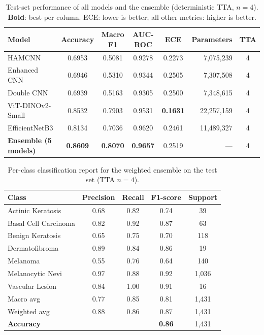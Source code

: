 \documentclass[10pt,twocolumn]{article}
\begin{document}
\begin{table}[t]
\centering
\small
\caption{Test-set performance of all models and the ensemble (deterministic TTA, $n=4$). \textbf{Bold}: best per column. ECE: lower is better; all other metrics: higher is better.}
\label{tab:results}
\begin{tabular}{lccccrc}
\toprule
\textbf{Model} & \textbf{Accuracy} & \textbf{Macro F1} & \textbf{AUC-ROC} & \textbf{ECE} & \textbf{Parameters} & \textbf{TTA} \\
\midrule
HAMCNN                        & 0.6953 & 0.5081 & 0.9278 & 0.2273          & 7,075,239  & 4 \\
Enhanced CNN                  & 0.6946 & 0.5310 & 0.9344 & 0.2505          & 7,307,508  & 4 \\
Double CNN                    & 0.6939 & 0.5163 & 0.9305 & 0.2500          & 7,348,615  & 4 \\
ViT-DINOv2-Small              & 0.8532 & 0.7903 & 0.9531 & \textbf{0.1631} & 22,257,159 & 4 \\
EfficientNetB3                & 0.8134 & 0.7036 & 0.9620 & 0.2461          & 11,489,327 & 4 \\
\midrule
\textbf{Ensemble (5 models)}  & \textbf{0.8609} & \textbf{0.8070} & \textbf{0.9657} & 0.2519 & --- & 4 \\
\bottomrule
\end{tabular}
\end{table}

\begin{table}[t]
\centering
\small
\caption{Per-class classification report for the weighted ensemble on the test set (TTA $n=4$).}
\label{tab:per_class}
\begin{tabular}{lcccc}
\toprule
\textbf{Class} & \textbf{Precision} & \textbf{Recall} & \textbf{F1-score} & \textbf{Support} \\
\midrule
Actinic Keratosis    & 0.68 & 0.82 & 0.74 &     39 \\
Basal Cell Carcinoma & 0.82 & 0.92 & 0.87 &     63 \\
Benign Keratosis     & 0.65 & 0.75 & 0.70 &    118 \\
Dermatofibroma       & 0.89 & 0.84 & 0.86 &     19 \\
Melanoma             & 0.55 & 0.76 & 0.64 &    140 \\
Melanocytic Nevi     & 0.97 & 0.88 & 0.92 &  1,036 \\
Vascular Lesion      & 0.84 & 1.00 & 0.91 &     16 \\
\midrule
Macro avg            & 0.77 & 0.85 & 0.81 &  1,431 \\
Weighted avg         & 0.88 & 0.86 & 0.87 &  1,431 \\
\textbf{Accuracy}    &      &      & \textbf{0.86} & 1,431 \\
\bottomrule
\end{tabular}
\end{table}
\end{document}
